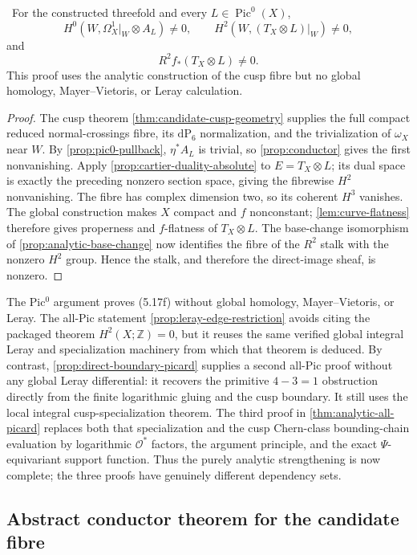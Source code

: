 \begin{corollary}
\label{cor:candidate-pic0-route}
\Verified\ For the constructed threefold and every
$L\in\operatorname{Pic}^0(X)$,
\[
 H^0(W,\Omega_X^1|_W\otimes A_L)\ne0,
 \qquad
 H^2(W,(T_X\otimes L)|_W)\ne0,
\]
and
\[
 R^2f_*(T_X\otimes L)\ne0.
\tag{5.17f}
\]
This proof uses the analytic construction of the cusp fibre but no global
homology, Mayer--Vietoris, or Leray calculation.
\end{corollary}

\begin{proof}
The cusp theorem \cref{thm:candidate-cusp-geometry} supplies the full compact
reduced normal-crossings fibre, its $\mathrm{dP}_6$ normalization, and the
trivialization of $\omega_X$ near $W$.  By
\cref{prop:pic0-pullback}, $\eta^*A_L$ is trivial, so
\cref{prop:conductor} gives the first nonvanishing.  Apply
\cref{prop:cartier-duality-absolute} to $E=T_X\otimes L$; its dual space is
exactly the preceding nonzero section space, giving the fibrewise $H^2$
nonvanishing.  The fibre has complex dimension two, so its coherent
$H^3$ vanishes.  The global construction makes $X$ compact and $f$
nonconstant; \cref{lem:curve-flatness} therefore gives properness and
$f$-flatness of $T_X\otimes L$.  The base-change isomorphism of
\cref{prop:analytic-base-change} now identifies the fibre of the $R^2$
stalk with the nonzero $H^2$ group.  Hence the stalk, and therefore the
direct-image sheaf, is nonzero.
\end{proof}

\begin{remark}
The Pic$^0$ argument proves (5.17f) without global homology,
Mayer--Vietoris, or Leray.  The all-Pic statement
\cref{prop:leray-edge-restriction} avoids citing the packaged theorem
$H^2(X;\mathbb Z)=0$, but it reuses the same verified global integral
Leray and specialization machinery from which that theorem is deduced.
By contrast, \cref{prop:direct-boundary-picard} supplies a second all-Pic
proof without any global Leray differential: it recovers the primitive
$4-3=1$ obstruction directly from the finite logarithmic gluing and the
cusp boundary.  It still uses the local integral cusp-specialization
theorem.  The third proof in \cref{thm:analytic-all-picard} replaces both
that specialization and the cusp Chern-class bounding-chain evaluation by
logarithmic $\mathcal O^*$ factors, the argument principle, and the exact
$\Psi$-equivariant support function.  Thus the purely analytic
strengthening is now complete; the three proofs have genuinely different
dependency sets.
\end{remark}

\subsection{Abstract conductor theorem for the candidate fibre}

